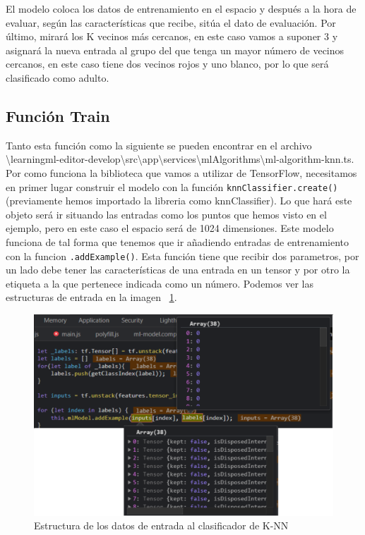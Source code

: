 \documentclass[a4paper, 12pt]{book}
\begin{document}
El modelo coloca los datos de entrenamiento en el espacio y después a la hora de evaluar, según las características que recibe, sitúa el dato de evaluación. Por último, mirará los K vecinos más cercanos, en este caso vamos a suponer 3 y asignará la nueva entrada al grupo del que tenga un mayor número de vecinos cercanos, en este caso tiene dos vecinos rojos y uno blanco, por lo que será clasificado como adulto.

\subsection{Función Train} 
\label{sec:funciontrainknn}

Tanto esta función como la siguiente se pueden encontrar en el archivo \textbackslash learningml-editor-develop\textbackslash src\textbackslash app\textbackslash services\textbackslash mlAlgorithms\textbackslash ml-algorithm-knn.ts.\\
Por como funciona la biblioteca que vamos a utilizar de TensorFlow, necesitamos en primer lugar construir el modelo con la función  \texttt{knnClassifier.create()} (previamente hemos importado la libreria como knnClassifier). Lo que hará este objeto será ir situando las entradas como los puntos que hemos visto en el ejemplo, pero en este caso el espacio será de 1024 dimensiones. Este modelo funciona de tal forma que tenemos que ir añadiendo entradas de entrenamiento con la funcion \texttt{.addExample()}. Esta función tiene que recibir dos parametros, por un lado debe tener las características de una entrada en un tensor y por otro la etiqueta a la que pertenece indicada como un número. Podemos ver las estructuras de entrada en la imagen ~\ref{fig:entradasclasificadorknn}.

\begin{figure}
	\centering
	\includegraphics[width=12cm, keepaspectratio]{img/entradasclasificadorknn}
	\caption{Estructura de los datos de entrada al clasificador de K-NN}				
	\label{fig:entradasclasificadorknn}
\end{figure}
\end{document}

